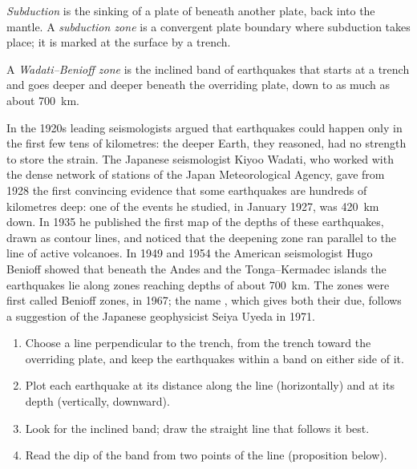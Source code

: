 \begin{definition}\label{def:g11:subduction-zones:subduction}
\emph{Subduction} is the sinking of a plate of  beneath another plate, back into the mantle. A \emph{subduction
zone} is a convergent plate boundary where subduction
takes place; it is marked at the surface by a trench.
\end{definition}

\begin{definition}\label{def:g11:subduction-zones:benioff}
A \emph{Wadati--Benioff zone} is the inclined
band of earthquakes that starts at a trench and goes deeper and deeper beneath
the overriding plate, down to as much as about \qty{700}{km}.
\end{definition}

\begin{history}
In the 1920s leading seismologists argued that earthquakes could happen
only in the first few tens of kilometres: the deeper Earth, they reasoned,
had no strength to store the strain. The Japanese seismologist Kiyoo Wadati, who worked with the
dense network of stations of the Japan Meteorological Agency, gave from 1928
the first convincing evidence that some earthquakes are hundreds of
kilometres deep: one of the events he studied, in January 1927, was
\qty{420}{km} down. In 1935 he published the first map of the depths of
these earthquakes, drawn as contour lines, and noticed that the deepening
zone ran parallel to the line of active volcanoes. In 1949 and 1954 the
American seismologist Hugo Benioff showed that beneath the Andes and the
Tonga--Kermadec islands the earthquakes lie along zones reaching depths of
about \qty{700}{km}. The zones were first called Benioff zones, in 1967; the
name , which gives both their due, follows a suggestion
of the Japanese geophysicist Seiya Uyeda in 1971.
\end{history}

\begin{method}\label{met:g11:subduction-zones:section}
\begin{enumerate}
  \item Choose a line perpendicular to the trench, from the trench toward the
        overriding plate, and keep the earthquakes within a band on either
        side of it.
  \item Plot each earthquake at its distance along the line (horizontally)
        and at its depth (vertically, downward).
  \item Look for the inclined band; draw the straight line that follows it
        best.
  \item Read the dip of the band from two points of the line (proposition
        below).
\end{enumerate}
\end{method}

